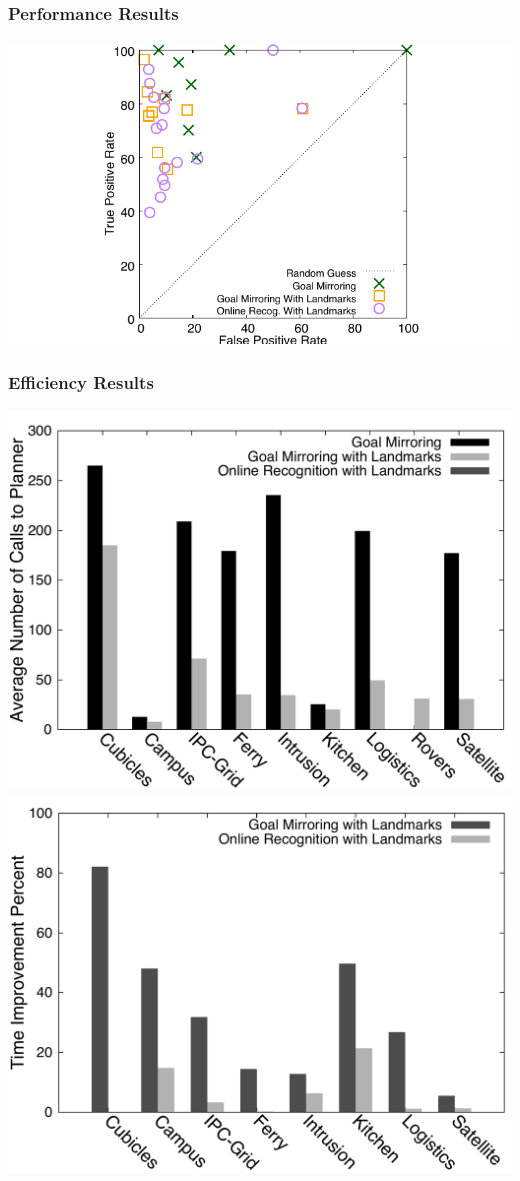 \documentclass{beamer}
\begin{document}
	\begin{frame}[c]\frametitle{Performance Results}
		\begin{center}
			\includegraphics[width=.8\textwidth]{roc_space-online_approaches/rocspace-all_domains-online.pdf}
		\end{center}
	\end{frame}
	
	\begin{frame}[c]\frametitle{Efficiency Results}
		\begin{center}
			\includegraphics[width=.45\textwidth]{fig/histogram-number_of_calls_to_planner.pdf}
			\includegraphics[width=.45\textwidth]{fig/histogram-time_improvement_percent.pdf}
		\end{center}
	\end{frame}
	
\end{document}
